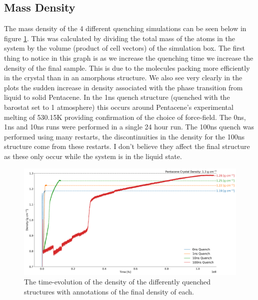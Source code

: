 \subsection{Mass Density}
The mass density of the 4 different quenching simulations can be seen below in figure \ref{fig:QuenchDensity}. This was calculated by dividing the total mass of the atoms in the system by the volume (product of cell vectors) of the simulation box. The first thing to notice in this graph is as we increase the quenching time we increase the density of the final sample. This is due to the molecules packing more efficiently in the crystal than in an amorphous structure. We also see very clearly in the plots the sudden increase in density associated with the phase transition from liquid to solid Pentacene. In the 1ns quench structure (quenched with the barostat set to 1 atmosphere) this occurs around Pentacene's experimental melting of 530.15K \cite{PentaceneMeltingPoint} providing confirmation of the choice of force-field. The 0ns, 1ns and 10ns runs were performed in a single 24 hour run. The 100ns quench was performed using many restarts, the discontinuities in the density for the 100ns structure come from these restarts. I don't believe they affect the final structure as these only occur while the system is in the liquid state.
\begin{figure}[H]
	\includegraphics[width=\textwidth]{./img/DifferentQuenchTimes/Density.png}
	\caption{\label{fig:QuenchDensity}The time-evolution of the density of the differently quenched structures with annotations of the final density of each.}
\end{figure}

